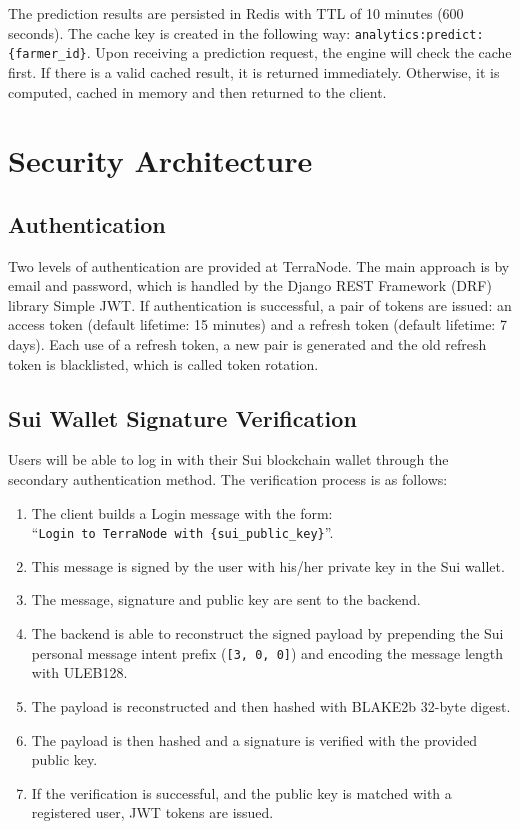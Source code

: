 The prediction results are persisted in Redis with TTL of 10 minutes (600 seconds). The cache key is created in the following way: \texttt{analytics:predict:}\allowbreak\texttt{\{farmer\_id\}}. Upon receiving a prediction request, the engine will check the cache first. If there is a valid cached result, it is returned immediately. Otherwise, it is computed, cached in memory and then returned to the client.

\section{Security Architecture}

\subsection{Authentication}

Two levels of authentication are provided at TerraNode. The main approach is by email and password, which is handled by the Django REST Framework (DRF) library Simple JWT. If authentication is successful, a pair of tokens are issued: an access token (default lifetime: 15 minutes) and a refresh token (default lifetime: 7 days). Each use of a refresh token, a new pair is generated and the old refresh token is blacklisted, which is called token rotation.

\subsection{Sui Wallet Signature Verification}
\label{sec:wallet_verify}

Users will be able to log in with their Sui blockchain wallet through the secondary authentication method. The verification process is as follows:

\begin{enumerate}[label=(\roman*)]
    \item The client builds a Login message with the form: \\ ``\texttt{Login to TerraNode with \{sui\_public\_key\}}''.
    \item This message is signed by the user with his/her private key in the Sui wallet.
    \item The message, signature and public key are sent to the backend.
    \item The backend is able to reconstruct the signed payload by prepending the Sui personal message intent prefix (\texttt{[3, 0, 0]}) and encoding the message length with ULEB128.
    \item The payload is reconstructed and then hashed with BLAKE2b 32-byte digest.
    \item The payload is then hashed and a signature is verified with the provided public key.
    \item If the verification is successful, and the public key is matched with a registered user, JWT tokens are issued.
\end{enumerate}

